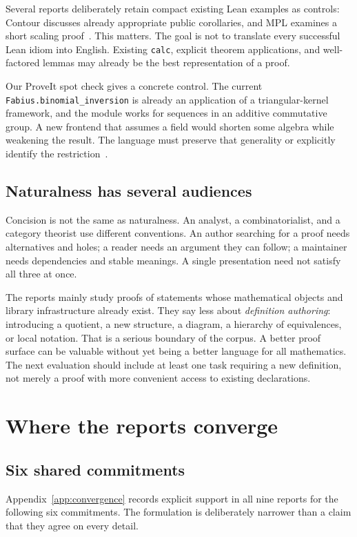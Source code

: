 \documentclass[11pt,letterpaper]{article}
\newcommand{\code}[1]{\nolinkurl{#1}}
\begin{document}
Several reports deliberately retain compact existing Lean examples as controls:
Contour discusses already appropriate public corollaries, and MPL examines a
short scaling proof~\cite[\S2.5]{contour}\cite[\S9]{mpl}. This matters. The goal is
not to translate every successful Lean idiom into English. Existing \code{calc},
explicit theorem applications, and well-factored lemmas may already be the best
representation of a proof.

Our ProveIt spot check gives a concrete control. The current
\code{Fabius.binomial_inversion} is already an application of a triangular-kernel
framework, and the module works for sequences in an additive commutative group.
A new frontend that assumes a field would shorten some algebra while weakening
the result. The language must preserve that generality or explicitly identify the
restriction~\cite{p-binomial}.

\subsection{Naturalness has several audiences}
Concision is not the same as naturalness. An analyst, a combinatorialist, and a
category theorist use different conventions. An author searching for a proof
needs alternatives and holes; a reader needs an argument they can follow; a
maintainer needs dependencies and stable meanings. A single presentation need
not satisfy all three at once.

The reports mainly study proofs of statements whose mathematical objects and
library infrastructure already exist. They say less about \emph{definition authoring}:
introducing a quotient, a new structure, a diagram, a hierarchy of equivalences,
or local notation. That is a serious boundary of the corpus. A better proof
surface can be valuable without yet being a better language for all mathematics.
The next evaluation should include at least one task requiring a new definition,
not merely a proof with more convenient access to existing declarations.

\section{Where the reports converge}\label{sec:convergence}
\subsection{Six shared commitments}
Appendix~\ref{app:convergence} records explicit support in all nine reports for the
following six commitments. The formulation is deliberately narrower than a claim
that they agree on every detail.
\end{document}
